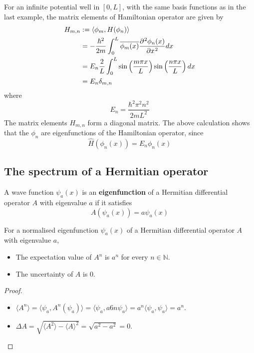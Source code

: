 \begin{example}
	For an infinite potential well in $[0, L]$, with the same basis functions as in the last example, the matrix elements of Hamiltonian operator are given by
	\[
		\begin{aligned}
			H_{m, n}
				& := \langle \phi_m, H(\phi_n) \rangle \\
				& = -\frac{\hbar^2}{2m} \int_{0}^{L} \overline{\phi_m(x)} \diffp[2]{\phi_n(x)}{x} dx \\
				& = E_n \frac{2}{L} \int_{0}^{L} \sin \left( \frac{m \pi x}{L} \right) \sin \left( \frac{n \pi x}{L} \right) dx \\
				& = E_n \delta_{m, n}
		\end{aligned}
	\]
	where
	\[
		E_n = \frac{\hbar^2 \pi^2 n^2}{2m L^2}
	\]
	The matrix elements $H_{m, n}$ form a diagonal matrix. The above calculation shows that the $\phi_n$ are eigenfunctions of the Hamiltonian operator, since
	\[
		\hat{H}(\phi_n(x)) = E_n \phi_n(x)
	\]
\end{example}

\subsection{The spectrum of a Hermitian operator}

\begin{definition}
	A wave function $\psi_a(x)$ is an \textbf{eigenfunction} of a Hermitian differential operator $A$ with eigenvalue $a$ if it satisfies
	\[
		A(\psi_a(x)) = a \psi_a(x)
	\]
\end{definition}

\begin{proposition}
	For a normalised eigenfunction $\psi_a(x)$ of a Hermitian differential operator $A$ with eigenvalue $a$,
	\begin{itemize}
		\item The expectation value of $A^n$ is $a^n$ for every $n \in \mathbb{N}$.
		\item The uncertainty of $A$ is $0$.
	\end{itemize}
\end{proposition}

\begin{proof}
	\hfill
	\begin{itemize}
		\item $\langle A^n \rangle = \langle \psi_a, A^n(\psi_a) \rangle = \langle \psi_a, a6n \psi_a \rangle = a^n \langle \psi_a, \psi_a \rangle = a^n$.
		\item $\Delta A = \sqrt{\langle A^2 \rangle - {\langle A \rangle}^2} = \sqrt{a^2 - a^2} = 0$.
	\end{itemize}
\end{proof}

